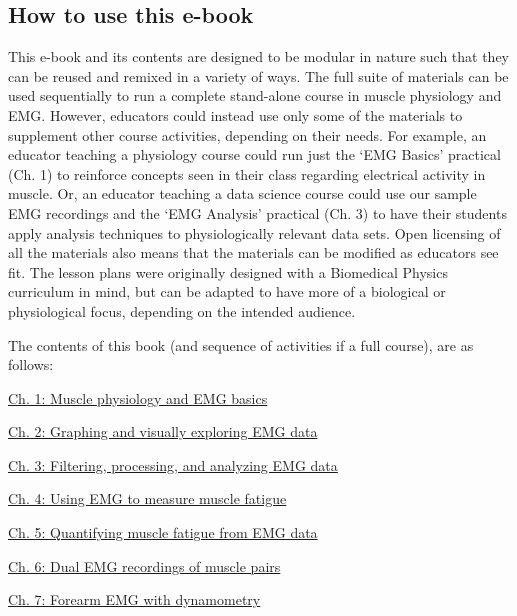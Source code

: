 \documentclass{article}
\begin{document}
\subsection{How to use this e-book}

This e-book and its contents are designed to be modular in nature such that they can be reused and remixed in a variety of ways. The full suite of materials can be used sequentially to run a complete stand-alone course in muscle physiology and EMG. However, educators could instead use only some of the materials to supplement other course activities, depending on their needs. For example, an educator teaching a physiology course could run just the `EMG Basics' practical (Ch. 1) to reinforce concepts seen in their class regarding electrical activity in muscle. Or, an educator teaching a data science course could use our sample EMG recordings and the `EMG Analysis' practical (Ch. 3) to have their students apply analysis techniques to physiologically relevant data sets. Open licensing of all the materials also means that the materials can be modified as educators see fit. The lesson plans were originally designed with a Biomedical Physics curriculum in mind, but can be adapted to have more of a biological or physiological focus, depending on the intended audience.

The contents of this book (and sequence of activities if a full course), are as follows:

\href{https://curvenote.com/oxa:EPpXta8zJdzN048lz8AR/hZTnTYzQR5EQmCKX51Wj}{Ch. 1: Muscle physiology and EMG basics}

\href{https://curvenote.com/oxa:EPpXta8zJdzN048lz8AR/ASFQasVwRldUZm0nb6RC}{Ch. 2: Graphing and visually exploring EMG data}

\href{https://curvenote.com/oxa:EPpXta8zJdzN048lz8AR/N4aWmYttZWOcQi2i2rNZ}{Ch. 3: Filtering, processing, and analyzing EMG data}

\href{https://curvenote.com/oxa:EPpXta8zJdzN048lz8AR/oZzZ9YkLDYhuIWC3d5Sk}{Ch. 4: Using EMG to measure muscle fatigue}

\href{https://curvenote.com/oxa:EPpXta8zJdzN048lz8AR/vW8ZGtkrQs3vPifO99sp}{Ch. 5: Quantifying muscle fatigue from EMG data}

\href{https://curvenote.com/oxa:EPpXta8zJdzN048lz8AR/pIDHVE4gOQaQL1y9Os3r}{Ch. 6: Dual EMG recordings of muscle pairs}

\href{https://curvenote.com/oxa:EPpXta8zJdzN048lz8AR/ezirbKT2x8fYE4rCdOgB}{Ch. 7: Forearm EMG with dynamometry}
\end{document}
